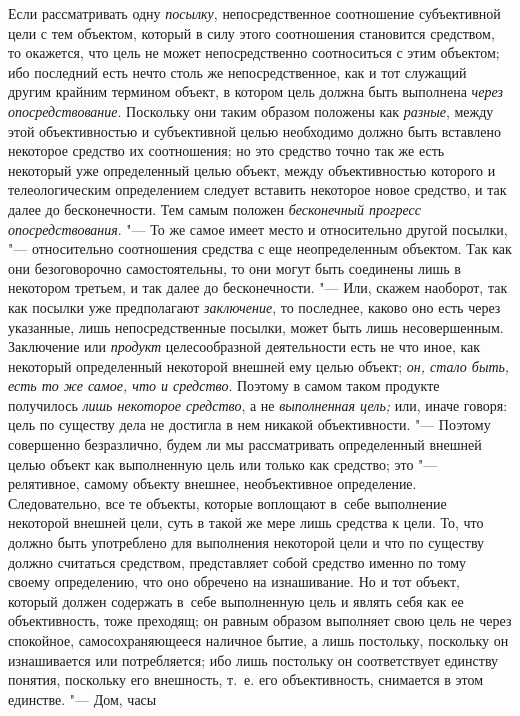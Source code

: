 Если рассматривать одну
{\em посылку},
непосредственное соотношение субъективной цели с тем
объектом, который в силу этого соотношения становится средством, то
окажется, что цель не может непосредственно соотноситься с этим объектом;
ибо последний есть нечто столь же непосредственное, как и тот служащий
другим крайним термином объект, в котором цель должна быть выполнена
{\em через опосредствование}.
Поскольку они таким образом положены как
{\em разные}, между этой
объективностью и субъективной целью необходимо должно быть вставлено
некоторое средство их соотношения; но это средство точно так же есть
некоторый уже определенный целью объект, между объективностью которого и
телеологическим определением следует вставить некоторое новое средство, и
так далее до бесконечности. Тем самым положен
{\em бесконечный прогресс}
{\em опосредствования}. "---
То же самое имеет место и относительно другой
посылки, "--- относительно соотношения средства с еще
неопределенным объектом. Так как они безоговорочно самостоятельны, то они
могут быть соединены лишь в некотором третьем, и так далее до
бесконечности. "--- Или, скажем наоборот, так как посылки уже
предполагают {\em заключение},
то последнее, каково оно есть через указанные, лишь
непосредственные посылки, может быть лишь несовершенным. Заключение или
{\em продукт} целесообразной деятельности есть не что иное, как некоторый
определенный некоторой внешней ему целью объект;
{\em он, стало быть, есть то же самое,
что и средство}. Поэтому в самом таком продукте получилось
{\em лишь некоторое средство}, а не {\em выполненная
цель;} или, иначе говоря: цель по существу дела не достигла
в нем никакой объективности. "--- Поэтому совершенно
безразлично, будем ли мы рассматривать определенный внешней целью объект
как выполненную цель или только как средство; это
"--- релятивное, самому объекту внешнее, необъективное
определение. Следовательно, все те объекты, которые воплощают в~себе
выполнение некоторой внешней цели, суть в такой же мере лишь средства к
цели. То, что должно быть употреблено для выполнения некоторой цели и что
по существу должно считаться средством, представляет собой средство именно
по тому своему определению, что оно обречено на изнашивание. Но и тот
объект, который должен содержать в~себе выполненную цель и являть себя как
ее объективность, тоже преходящ; он равным образом выполняет свою цель не
через спокойное, самосохраняющееся наличное бытие, а лишь постольку,
поскольку он изнашивается или потребляется; ибо лишь постольку он
соответствует единству понятия, поскольку его внешность, т.~е. его
объективность, снимается в этом единстве. "--- Дом, часы
